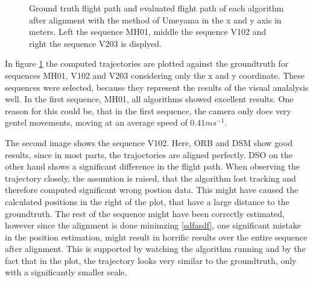 	\begin{figure}%
    \centering
    \qquad
	\qquad
    \caption{
	Ground truth flight path and evaluated flight path of each algorithm after alignment with the method of Umeyama in the x and y axis in meters. 
	Left the sequence MH01, middle the sequence V102 and right the sequence V203 is displyed.
	}%
    \label{fig:flight_path}%
	\end{figure}
	
	In figure \ref{fig:flight_path} the computed trajectories are plotted against the groundtruth for sequences MH01, V102 and V203 considering only the 
	x and y coordinate. These sequences 
	were selected, because they represent the results of the visual analalysis well. In the first sequence, MH01, all algorithms showed excellent results. 
	One reason for this could be, that in the first sequence, the camera only does very gentel movements, moving at an average speed of $0.41 ms^{-1}$. 
	
	The second image shows the sequence V102. Here, ORB and DSM show good results, since in most parts, the trajoctories are aligned perfectly. DSO on the 
	other hand shows a significant difference in the flight path. When observing the trajectory closely, the assumtion is raised, that the algorithm lost tracking 
	and therefore computed significant wrong postion data. This might have caused the calculated positions in the right of the plot, that have a large distance to 
	the groundtruth. The rest of the sequence might have been correctly estimated, however since the alignment is done minimzing \ref{sdfasdf}, one significant 
	mistake in the position estimation, might result in horrific results over the entire sequence after alignment. This is supported by watching the algorithm running
	and by the fact that in the plot, the trajectory looks very similar to the groundtruth, only with a significantly smaller scale.
	
